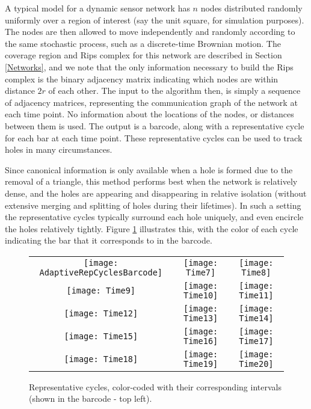 \documentclass[12pt]{article}
\begin{document}
A typical model for a dynamic sensor network has $n$ nodes distributed randomly uniformly over a region of interest (say the unit square, for simulation purposes). The nodes are then allowed to move independently and randomly according to the same stochastic process, such as a discrete-time Brownian motion. The coverage region and Rips complex for this network are described in Section \ref{Networks}, and we note that the only information necessary to build the Rips complex is the binary adjacency matrix indicating which nodes are within distance $2r$ of each other. The input to the algorithm then, is simply a sequence of adjacency matrices, representing the communication graph of the network at each time point. No information about the locations of the nodes, or distances between them is used. The output is a barcode, along with a representative cycle for each bar at each time point. These representative cycles can be used to track holes in many circumstances.

Since canonical information is only available when a hole is formed due to the removal of a triangle, this method performs best when the network is relatively dense, and the holes are appearing and disappearing in relative isolation (without extensive merging and splitting of holes during their lifetimes). In such a setting the representative cycles typically surround each hole uniquely, and even encircle the holes relatively tightly. Figure \ref{DenseNetwork} illustrates this, with the color of each cycle indicating the bar that it corresponds to in the barcode.

\begin{figure}[htp]
\begin{center}
\begin{tabular}{ccc}
\texttt{[image: AdaptiveRepCyclesBarcode]} & \texttt{[image: Time7]} & \texttt{[image: Time8]} \\
\texttt{[image: Time9]} & \texttt{[image: Time10]} & \texttt{[image: Time11]}  \\
\texttt{[image: Time12]} & \texttt{[image: Time13]} & \texttt{[image: Time14]} \\
\texttt{[image: Time15]} & \texttt{[image: Time16]} & \texttt{[image: Time17]} \\
\texttt{[image: Time18]} & \texttt{[image: Time19]} & \texttt{[image: Time20]} \\
\end{tabular}
\end{center}
\caption{Representative cycles, color-coded with their corresponding intervals (shown in the barcode - top left). \label{DenseNetwork}}
\end{figure}
\end{document}

